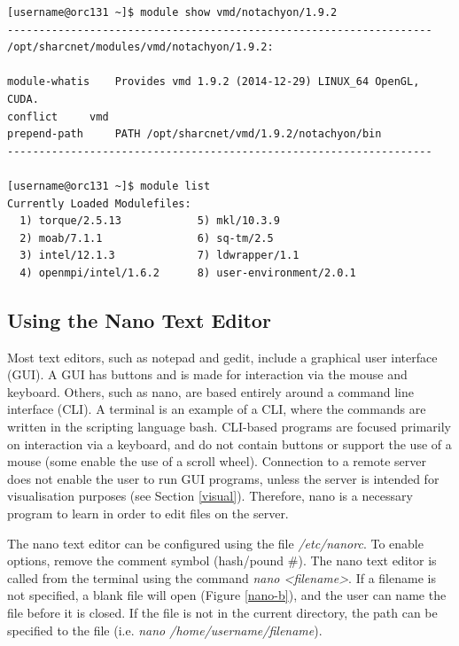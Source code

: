 \documentclass[12pt]{article}
\begin{document}
\begin{lstlisting}[numbers=none]
[username@orc131 ~]$ module show vmd/notachyon/1.9.2 
-------------------------------------------------------------------
/opt/sharcnet/modules/vmd/notachyon/1.9.2:

module-whatis	 Provides vmd 1.9.2 (2014-12-29) LINUX_64 OpenGL, CUDA. 
conflict	 vmd 
prepend-path	 PATH /opt/sharcnet/vmd/1.9.2/notachyon/bin 
-------------------------------------------------------------------

[username@orc131 ~]$ module list
Currently Loaded Modulefiles:
  1) torque/2.5.13            5) mkl/10.3.9
  2) moab/7.1.1               6) sq-tm/2.5
  3) intel/12.1.3             7) ldwrapper/1.1
  4) openmpi/intel/1.6.2      8) user-environment/2.0.1
\end{lstlisting}


\subsection{Using the Nano Text Editor}
\quad\enskip\quad Most text editors, such as notepad and gedit, include a graphical user interface (GUI). A GUI has buttons and is made for interaction via the mouse and keyboard. Others, such as nano, are based entirely around a command line interface (CLI). A terminal is an example of a CLI, where the commands are written in the scripting language bash. CLI-based programs are focused primarily on interaction via a keyboard, and do not contain buttons or support the use of a mouse (some enable the use of a scroll wheel). Connection to a remote server does not enable the user to run GUI programs, unless the server is intended for visualisation purposes (see Section \ref{visual}). Therefore, nano is a necessary program to learn in order to edit files on the server.

\quad The nano text editor can be configured using the file \textit{/etc/nanorc}. To enable options, remove the comment symbol (hash/pound \#). The nano text editor is called from the terminal using the command \textit{nano <filename>}. If a filename is not specified, a blank file will open (Figure \ref{nano-b}), and the user can name the file before it is closed. If the file is not in the current directory, the path can be specified to the file (i.e. \textit{nano /home/username/filename}).
\end{document}
